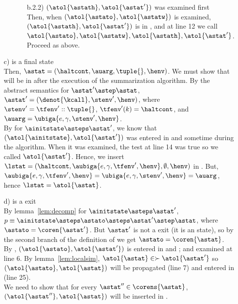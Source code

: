 \documentclass{LMCS}
\theoremstyle{definition} \newtheorem{property}[thm]{Property}
\begin{document}
\begin{enumerate}[$\bullet$]
\begin{enumerate}[$\bullet$]
\begin{enumerate}[$\bullet$]
    \item[b.2.2)]
      $(\atol{\astath}, \atol{\astat'})$ was examined first \\
      Then, when $(\atol{\astato}, \atol{\astatw})$ is examined,
      $(\atol{\astath}, \atol{\astat'})$ is in \summary{},
      and at line 12 we call 
      $\atol{\astato}, \atol{\astatw}, \atol{\astath}, \atol{\astat'}$\tw{)}. \\
      Proceed as above.
    \end{enumerate}
  \end{enumerate}
\item[c)]
  \astat{} is a final state \\
  Then, $\astat = (\haltcont, \auarg, \tuple{}, \henv)$. 
  We must show that \atol{\astat} will be in \finals{} after the execution of
  the summarization algorithm. 
  By the abstract semantics for $\astat' \astep \astat$, 
  $\astat' = (\denot{\kcall}, \stenv', \henv)$, 
  where $\stenv' = \tfenv'::\tuple{}$, 
  $\tfenv'(k) = \haltcont$,
  and $\auarg = \ubiga{e, \gamma, \stenv', \henv}$. \\
  By \ih{} for $\ainitstate \asteps \astat'$, we know that 
  $(\atol{\ainitstate}, \atol{\astat'})$ was entered in \work{} and \summary{}
  sometime during the algorithm.
  When it was examined, the test at line 14 was true so we called
  $\atol{\astat'}$\srp.
  Hence, we insert $\lstat = (\haltcont, \aubiga{e, \gamma, \tfenv', \henv},
  \emptyset, \henv)$ in \finals.
  But, $\aubiga{e, \gamma, \tfenv', \henv} = \ubiga{e, \gamma, \stenv', \henv} 
  = \auarg$, hence $\lstat = \atol{\astat}$.
\item[d)]
  \astat{} is a \daceval{} exit \\
  By lemma~\ref{lem:decomp} for $\ainitstate \asteps \astat'$, 
  $p \equiv \ainitstate \asteps \astato \asteps \astat' \astep 
  \astat$,
  where $\astato = \coren{\astat'}$. 
  But $\astat'$ is not a \daceval{} exit (it is an \daapply{} state), 
  so by the second branch of the definition of \dcoren{} 
  we get $\astato = \coren{\astat}$. \\
  By \ih{}, $(\atol{\astato}, \atol{\astat'})$ is entered in \seen{} and
  \work{}; and examined at line 6.
  By lemma~\ref{lem:localsim}, $\atol{\astat} \in \succ{\atol{\astat'}}$ 
  so $(\atol{\astato}, \atol{\astat})$ will be propagated (line 7)
  and entered in \seen{} (line 25). \\
  We need to show that for every $\astat'' \in \corens{\astat}$,
  $(\atol{\astat''}, \atol{\astat})$ will be inserted in \seen{}.

\end{enumerate}
\end{document}
